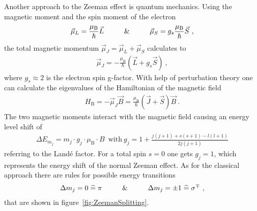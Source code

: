 Another approach to the Zeeman effect is quantum mechanics. Using the magnetic moment and the spin moment of the electron
	\begin{align}
		\vec{\mu}_L = \frac{\mu_{\text{B}}}{\hbar}\vec{L} \hspace{1.0cm} \&\hspace{1.0cm} \vec{\mu}_S = g_s\frac{\mu_{\text{B}}}{\hbar}\vec{S}\ ,
	\end{align}
the total magnetic momentum $\vec{\mu}_J = \vec{\mu}_L + \vec{\mu}_S$ calculates to
	\begin{align}
		\vec{\mu}_J = -\frac{\mu_{\text{B}}}{\hbar}(\vec{L} + g_s\vec{S})\ ,
	\end{align}
where $g_s \approx 2$ is the electron spin g-factor. 
With help of perturbation theory one can calculate the eigenvalues of the Hamiltonian of the magnetic field 
	\begin{align}
	H_{\text{B}} = -\vec{\mu}_J \vec{B} = \frac{\mu_{\text{B}}}{\hbar}(\vec{J}+\vec{S})\vec{B}\ .
	\end{align}
The two magnetic moments interact with the magnetic field causing an energy level shift of
	\begin{align}
		\label{eq:ZeemanEnergyShift}
		\Delta E_{m_{j}} = m_j \cdot g_j \cdot \mu_{\text{B}}\cdot B\, \text{ with}\ g_j = 1 + \frac{j(j+1)+s(s+1)-l(l+1)}{2j(j+1)}
	\end{align}
referring to the Land\'{e} factor. 
For a total spin $s=0$ one gets $g_j = 1$, which represents the energy shift of the normal Zeeman effect. 
As for the classical approach there are rules for possible energy transitions
	\begin{align}
		\Delta m_j = 0 \mathrel{\widehat{=}} \pi \hspace{1.0cm} \& \hspace{1.0cm} \Delta m_j = \pm 1 \mathrel{\widehat{=}} \sigma^{\mp}\ ,
	\end{align}
that are shown in figure~\ref{fig:ZeemanSplitting}.
